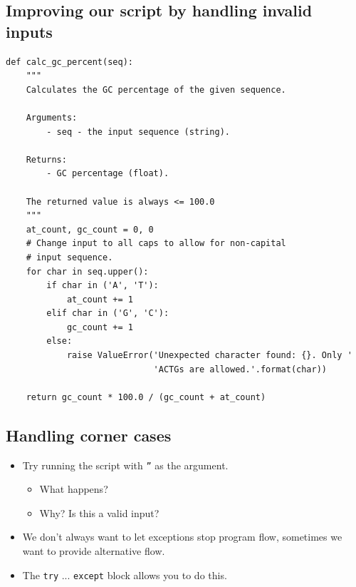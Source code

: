 \documentclass[aspectratio=1610,slidestop]{beamer}
\newenvironment{pythonfile}[1]
 {\begin{tcolorbox}[title=#1,
                    title filled=false,
                    coltitle=LUMCDonkerblauw,
                    fonttitle=\scriptsize,
                    fontupper=\footnotesize,
                    enhanced,
                    drop small lifted shadow,
                    boxrule=0.1mm,
                    leftrule=5mm,
                    rulecolor=white,
                    left=0.1cm,
                    colback=white!92!black,
                    colframe=scriptback]}
 {\end{tcolorbox}}
\begin{document}
\subsection{Improving our script by handling invalid inputs}
\begin{pframe}
 \begin{pythonfile}{seq\_toolbox.py}
  \begin{tiny}
  \begin{verbatim}
def calc_gc_percent(seq):
    """
    Calculates the GC percentage of the given sequence.

    Arguments:
        - seq - the input sequence (string).

    Returns:
        - GC percentage (float).

    The returned value is always <= 100.0
    """
    at_count, gc_count = 0, 0
    # Change input to all caps to allow for non-capital
    # input sequence.
    for char in seq.upper():
        if char in ('A', 'T'):
            at_count += 1
        elif char in ('G', 'C'):
            gc_count += 1
        else:
            raise ValueError('Unexpected character found: {}. Only '
                             'ACTGs are allowed.'.format(char))

    return gc_count * 100.0 / (gc_count + at_count)
    \end{verbatim}
  \end{tiny}
 \end{pythonfile}
\end{pframe}


\subsection{Handling corner cases}
\begin{pframe}
 \begin{itemize}
  \item Try running the script with \texttt{''} as the argument.
  \begin{itemize}
   \item What happens?
   \item Why? Is this a valid input?
  \end{itemize}
  \item We don't always want to let exceptions stop program flow,
  sometimes we want to provide alternative flow.
  \item The \texttt{try} ... \texttt{except} block
allows you to do this.
 \end{itemize}
\end{pframe}
\end{document}

